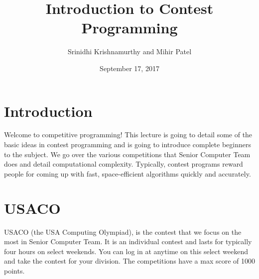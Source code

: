 \documentclass{article}
\title{Introduction to Contest Programming}
\author{Srinidhi Krishnamurthy and Mihir Patel}
\date{September 17, 2017}
\begin{document}
\maketitle

\section{Introduction}
Welcome to competitive programming! This lecture is going to detail some of the basic ideas in contest programming and is going to introduce complete beginners to the subject. We go over the various competitions that Senior Computer Team does and detail computational complexity. Typically, contest programs reward people for coming up with fast, space-efficient algorithms quickly and accurately. 

\section{USACO}
USACO (the USA Computing Olympiad), is the contest that we focus on the most in Senior Computer Team. It is an individual contest and lasts for typically four hours on select weekends. You can log in at anytime on this select weekend and take the contest for your division. The competitions have a max score of 1000 points.
\end{document}
